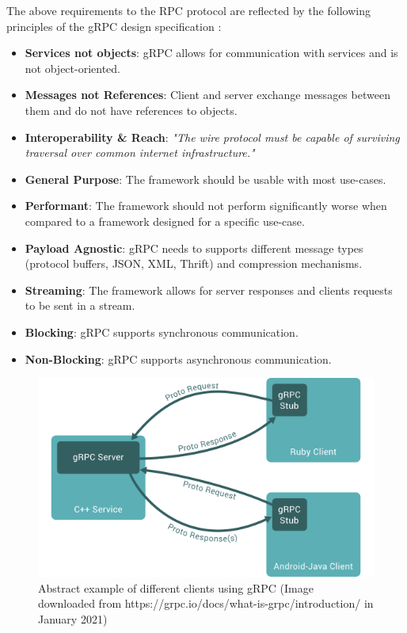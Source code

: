 \documentclass[conference]{IEEEtran}
\begin{document}
The above requirements to the RPC protocol are reflected by the following principles of the gRPC design specification \cite{grpcmotiviation}:

\begin{itemize}
	\item \textbf{Services not objects}: gRPC allows for communication with services and is not object-oriented.
	\item \textbf{Messages not References}: Client and server exchange messages between them and do not have references to objects.
	\item \textbf{Interoperability \& Reach}: \textit{"The wire protocol must be capable of surviving traversal over common internet infrastructure."} \cite{grpcmotiviation}
	\item \textbf{General Purpose}: The framework should be usable with most use-cases.
	\item \textbf{Performant}: The framework should not perform significantly worse when compared to a framework designed for a specific use-case.
	\item \textbf{Payload Agnostic}: gRPC needs to supports different message types (protocol buffers, JSON, XML, Thrift) and compression mechanisms.
	\item \textbf{Streaming}: The framework allows for server responses and clients requests to be sent in a stream.
	\item \textbf{Blocking}: gRPC supports synchronous communication.
	\item \textbf{Non-Blocking}: gRPC supports asynchronous communication.
\end{itemize}

\begin{figure}
	\centering
	\includegraphics[width=0.8\linewidth]{grpc1.png}
	\caption{Abstract example of different clients using gRPC (Image downloaded from https://grpc.io/docs/what-is-grpc/introduction/ in January 2021)}
	\label{fig:grpcuse}
\end{figure}
\end{document}
